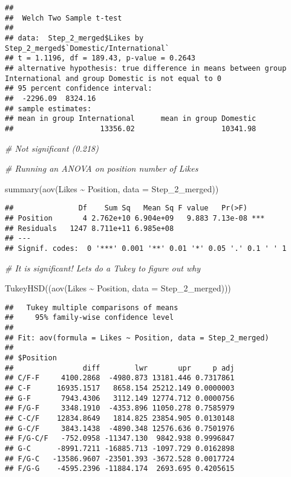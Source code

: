 \documentclass[
]{article}
\newenvironment{Shaded}{\begin{snugshade}}{\end{snugshade}}
\newcommand{\AttributeTok}[1]{\textcolor[rgb]{0.77,0.63,0.00}{#1}}
\newcommand{\CommentTok}[1]{\textcolor[rgb]{0.56,0.35,0.01}{\textit{#1}}}
\newcommand{\FunctionTok}[1]{\textcolor[rgb]{0.00,0.00,0.00}{#1}}
\newcommand{\NormalTok}[1]{#1}
\newcommand{\SpecialCharTok}[1]{\textcolor[rgb]{0.00,0.00,0.00}{#1}}
\begin{document}
\begin{verbatim}
## 
##  Welch Two Sample t-test
## 
## data:  Step_2_merged$Likes by Step_2_merged$`Domestic/International`
## t = 1.1196, df = 189.43, p-value = 0.2643
## alternative hypothesis: true difference in means between group International and group Domestic is not equal to 0
## 95 percent confidence interval:
##  -2296.09  8324.16
## sample estimates:
## mean in group International      mean in group Domestic 
##                    13356.02                    10341.98
\end{verbatim}

\begin{Shaded}
\begin{Highlighting}[]
\CommentTok{\# Not significant (0.218)}

\CommentTok{\# Running an ANOVA on position number of Likes}

\FunctionTok{summary}\NormalTok{(}\FunctionTok{aov}\NormalTok{(Likes }\SpecialCharTok{\textasciitilde{}}\NormalTok{ Position, }\AttributeTok{data =}\NormalTok{ Step\_2\_merged))}
\end{Highlighting}
\end{Shaded}

\begin{verbatim}
##               Df    Sum Sq   Mean Sq F value   Pr(>F)    
## Position       4 2.762e+10 6.904e+09   9.883 7.13e-08 ***
## Residuals   1247 8.711e+11 6.985e+08                     
## ---
## Signif. codes:  0 '***' 0.001 '**' 0.01 '*' 0.05 '.' 0.1 ' ' 1
\end{verbatim}

\begin{Shaded}
\begin{Highlighting}[]
\CommentTok{\# It is significant! Let\textquotesingle{}s do a Tukey to figure out why}

\FunctionTok{TukeyHSD}\NormalTok{((}\FunctionTok{aov}\NormalTok{(Likes }\SpecialCharTok{\textasciitilde{}}\NormalTok{ Position, }\AttributeTok{data =}\NormalTok{ Step\_2\_merged)))}
\end{Highlighting}
\end{Shaded}

\begin{verbatim}
##   Tukey multiple comparisons of means
##     95% family-wise confidence level
## 
## Fit: aov(formula = Likes ~ Position, data = Step_2_merged)
## 
## $Position
##                diff        lwr       upr     p adj
## C/F-F     4100.2868  -4980.873 13181.446 0.7317861
## C-F      16935.1517   8658.154 25212.149 0.0000003
## G-F       7943.4306   3112.149 12774.712 0.0000756
## F/G-F     3348.1910  -4353.896 11050.278 0.7585979
## C-C/F    12834.8649   1814.825 23854.905 0.0130148
## G-C/F     3843.1438  -4890.348 12576.636 0.7501976
## F/G-C/F   -752.0958 -11347.130  9842.938 0.9996847
## G-C      -8991.7211 -16885.713 -1097.729 0.0162898
## F/G-C   -13586.9607 -23501.393 -3672.528 0.0017724
## F/G-G    -4595.2396 -11884.174  2693.695 0.4205615
\end{verbatim}
\end{document}
